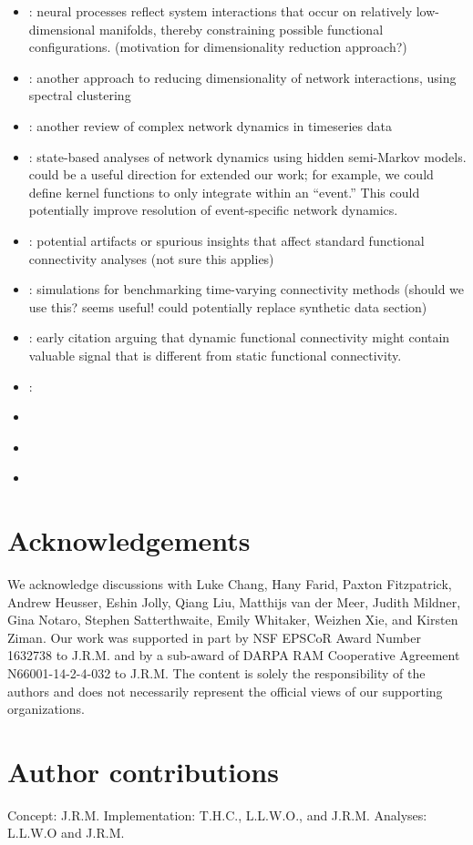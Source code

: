 \documentclass[english]{article}
\begin{document}
\begin{itemize}
\item \cite{McInJirs19}: neural processes reflect system interactions that occur on
relatively low-dimensional manifolds, thereby constraining possible
functional configurations.  (motivation for dimensionality reduction
approach?)

\item \cite{TokeSomm19}: another approach to reducing dimensionality of network
interactions, using spectral clustering

\item \cite{ZouEtal19}: another review of complex network dynamics in timeseries
data

\item \cite{ShapEtal19}: state-based analyses of network dynamics using hidden
semi-Markov models.  could be a useful direction for extended our
work; for example, we could define kernel functions to only integrate
within an ``event.''  This could potentially improve resolution of
event-specific network dynamics.

\item \cite{ColeEtal19}: potential artifacts or spurious insights that affect
standard functional connectivity analyses (not sure this applies)

\item \cite{RichEtal18}: simulations for benchmarking time-varying connectivity
methods (should we use this? seems useful! could potentially replace
synthetic data section)

\item \cite{ChanGlov10}: early citation arguing that dynamic
  functional connectivity might contain valuable signal that is
  different from static functional connectivity.

\item \cite{SizeEtal18}: 

\item \cite{ReimEtal17}

\item \cite{GonzEtal19}

\item \cite{BetzEtal19}

\end{itemize}



\section*{Acknowledgements}
We acknowledge discussions with Luke Chang, Hany Farid, Paxton
Fitzpatrick, Andrew Heusser, Eshin Jolly, Qiang Liu, Matthijs van der
Meer, Judith Mildner, Gina Notaro, Stephen Satterthwaite, Emily
Whitaker, Weizhen Xie, and Kirsten Ziman. Our work was supported in
part by NSF EPSCoR Award Number 1632738 to J.R.M. and by a sub-award
of DARPA RAM Cooperative Agreement N66001-14-2-4-032 to J.R.M.  The
content is solely the responsibility of the authors and does not
necessarily represent the official views of our supporting
organizations.

\section*{Author contributions}
Concept: J.R.M.  Implementation: T.H.C., L.L.W.O., and
J.R.M.  Analyses: L.L.W.O and J.R.M.



\end{document}
